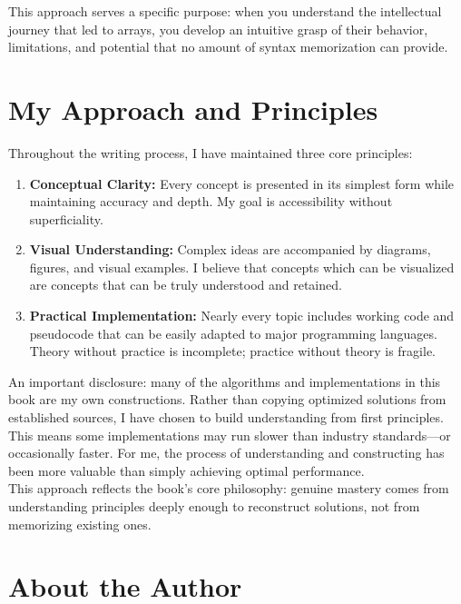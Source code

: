 This approach serves a specific purpose: when you understand the intellectual journey that led to arrays, you develop an intuitive grasp of their behavior, limitations, and potential that no amount of syntax memorization can provide.\\

\section*{My Approach and Principles}

Throughout the writing process, I have maintained three core principles:

\begin{enumerate}
	\item \textbf{Conceptual Clarity:} Every concept is presented in its simplest form while maintaining accuracy and depth. My goal is accessibility without superficiality.
	
	\item \textbf{Visual Understanding:} Complex ideas are accompanied by diagrams, figures, and visual examples. I believe that concepts which can be visualized are concepts that can be truly understood and retained.
	
	\item \textbf{Practical Implementation:} Nearly every topic includes working code and pseudocode that can be easily adapted to major programming languages. Theory without practice is incomplete; practice without theory is fragile.
\end{enumerate}

An important disclosure: many of the algorithms and implementations in this book are my own constructions. Rather than copying optimized solutions from established sources, I have chosen to build understanding from first principles. This means some implementations may run slower than industry standards—or occasionally faster. For me, the process of understanding and constructing has been more valuable than simply achieving optimal performance.\\

This approach reflects the book's core philosophy: genuine mastery comes from understanding principles deeply enough to reconstruct solutions, not from memorizing existing ones.\\

\section*{About the Author}

